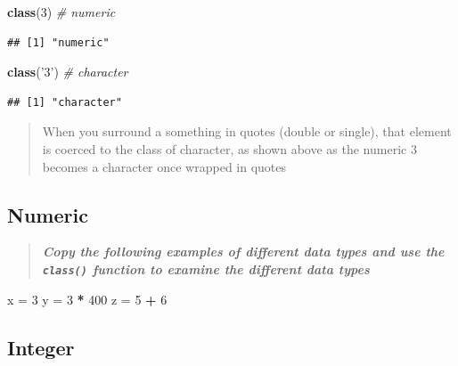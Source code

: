 \documentclass[
]{article}
\newenvironment{Shaded}{\begin{snugshade}}{\end{snugshade}}
\newcommand{\CommentTok}[1]{\textcolor[rgb]{0.56,0.35,0.01}{\textit{#1}}}
\newcommand{\DecValTok}[1]{\textcolor[rgb]{0.00,0.00,0.81}{#1}}
\newcommand{\KeywordTok}[1]{\textcolor[rgb]{0.13,0.29,0.53}{\textbf{#1}}}
\newcommand{\NormalTok}[1]{#1}
\newcommand{\OperatorTok}[1]{\textcolor[rgb]{0.81,0.36,0.00}{\textbf{#1}}}
\newcommand{\StringTok}[1]{\textcolor[rgb]{0.31,0.60,0.02}{#1}}
\begin{document}
\begin{Shaded}
\begin{Highlighting}[]
\KeywordTok{class}\NormalTok{(}\DecValTok{3}\NormalTok{) }\CommentTok{# numeric}
\end{Highlighting}
\end{Shaded}

\begin{verbatim}
## [1] "numeric"
\end{verbatim}

\begin{Shaded}
\begin{Highlighting}[]
\KeywordTok{class}\NormalTok{(}\StringTok{'3'}\NormalTok{) }\CommentTok{# character}
\end{Highlighting}
\end{Shaded}

\begin{verbatim}
## [1] "character"
\end{verbatim}

\begin{quote}
When you surround a something in quotes (double or single), that element
is coerced to the class of character, as shown above as the numeric 3
becomes a character once wrapped in quotes
\end{quote}

\hypertarget{numeric}{%
\subsection{Numeric}\label{numeric}}

\begin{quote}
\textbf{\emph{Copy the following examples of different data types and
use the \texttt{class()} function to examine the different data types}}
\end{quote}

\begin{Shaded}
\begin{Highlighting}[]
\NormalTok{x =}\StringTok{ }\DecValTok{3}  
\NormalTok{y =}\StringTok{ }\DecValTok{3} \OperatorTok{*}\StringTok{ }\DecValTok{400}
\NormalTok{z =}\StringTok{ }\DecValTok{5} \OperatorTok{+}\StringTok{ }\DecValTok{6}
\end{Highlighting}
\end{Shaded}

\hypertarget{integer}{%
\subsection{Integer}\label{integer}}
\end{document}
